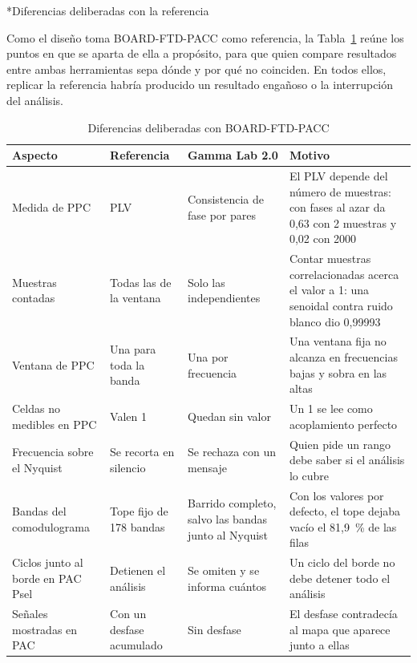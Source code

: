 \documentclass[12pt,letterpaper,oneside]{article}
\makeatletter
\newcommand{\subsubsubsection}[1]{%
  \@startsection{paragraph}{4}{\z@}{10pt plus 2pt minus 1pt}{4pt}%
    {\normalfont\normalsize\bfseries\itshape}*{#1}}
\makeatother
\begin{document}
\subsubsubsection{Diferencias deliberadas con la referencia}
\label{sec:diferencias}

Como el diseño toma BOARD-FTD-PACC \cite{gauthier2023} como referencia, la Tabla~\ref{tab:diferencias} reúne los puntos en que se aparta de ella a propósito, para que quien compare resultados entre ambas herramientas sepa dónde y por qué no coinciden. En todos ellos, replicar la referencia habría producido un resultado engañoso o la interrupción del análisis.

\begin{table}[!htb]
  \centering
  \small{}
  \renewcommand{\arraystretch}{1.15}
  \begin{tabular}{|>{\raggedright\arraybackslash}p{2.5cm}|>{\raggedright\arraybackslash}p{3.2cm}|>{\raggedright\arraybackslash}p{3.4cm}|>{\raggedright\arraybackslash}p{4.7cm}|}
    \hline
    \textbf{Aspecto} & \textbf{Referencia} & \textbf{Gamma Lab 2.0} & \textbf{Motivo} \\ \hline
    Medida de PPC & PLV & Consistencia de fase por pares & El PLV depende del número de muestras: con fases al azar da 0,63 con 2 muestras y 0,02 con 2000 \\ \hline
    Muestras contadas & Todas las de la ventana & Solo las independientes & Contar muestras correlacionadas acerca el valor a 1: una senoidal contra ruido blanco dio 0,99993 \\ \hline
    Ventana de PPC & Una para toda la banda & Una por frecuencia & Una ventana fija no alcanza en frecuencias bajas y sobra en las altas \\ \hline
    Celdas no medibles en PPC & Valen 1 & Quedan sin valor & Un 1 se lee como acoplamiento perfecto \\ \hline
    Frecuencia sobre el Nyquist & Se recorta en silencio & Se rechaza con un mensaje & Quien pide un rango debe saber si el análisis lo cubre \\ \hline
    Bandas del comodulograma & Tope fijo de 178 bandas & Barrido completo, salvo las bandas junto al Nyquist & Con los valores por defecto, el tope dejaba vacío el 81,9~\% de las filas \\ \hline
    Ciclos junto al borde en PAC Psel & Detienen el análisis & Se omiten y se informa cuántos & Un ciclo del borde no debe detener todo el análisis \\ \hline
    Señales mostradas en PAC & Con un desfase acumulado & Sin desfase & El desfase contradecía al mapa que aparece junto a ellas \\ \hline
  \end{tabular}
\caption{Diferencias deliberadas con BOARD-FTD-PACC \cite{gauthier2023}}
\label{tab:diferencias}
\end{table}
\end{document}
